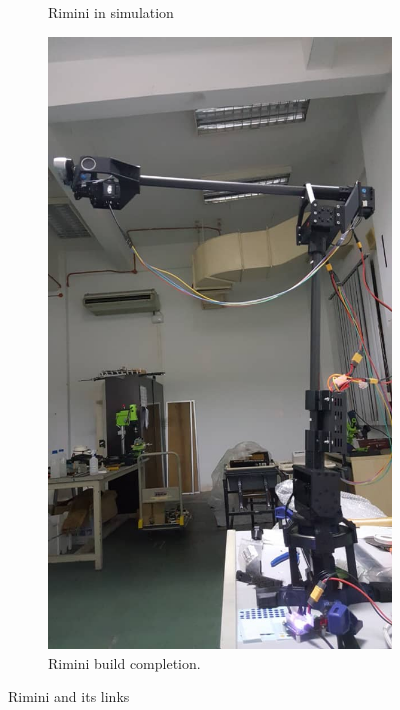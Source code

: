 \begin{figure}[h!]
\begin{subfigure}[c]{0.4\linewidth}
    \caption{Rimini in simulation}
  \end{subfigure}
  \begin{subfigure}[c]{0.4\linewidth}
    \includegraphics[width=\linewidth]{r_mini_hw.jpeg}
    \caption{Rimini build completion.}
  \end{subfigure}

\caption{Rimini and its links}
  \label{fig:rimini_links}
\end{figure}
